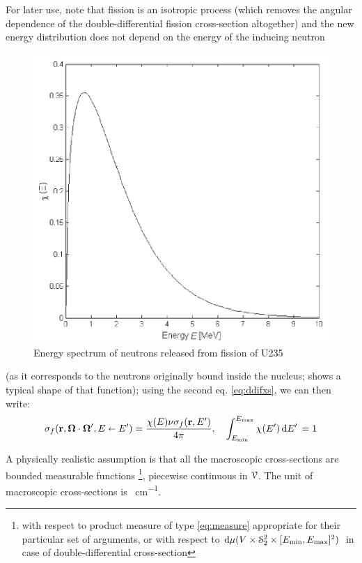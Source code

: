 For later use, note that fission is an isotropic process (which removes the angular dependence of the
double-differential fission cross-section altogether) and the new energy distribution does not depend on the energy of 
the inducing neutron 
\begin{figure}[hbt]
\begin{center}
  \includegraphics[scale=.6]{spectrum}
  \caption{Energy spectrum of neutrons released from fission of U235}
  \label{fig:spectrum}
\end{center}
\end{figure}
(as it corresponds to the neutrons originally bound inside the nucleus; 
shows a typical shape of that function); using the second eq.
\eqref{eq:ddifxs}, we can then write:
\begin{equation}\label{eq:sf}
\sigma_f(\br,\bomega\cdot\bomega',E\sla E') = \frac{\chi(E)\nu\sigma_f(\br,E')}{4\pi},\quad 
\intE[']{\Emin}{\Emax}{\chi(E')} = 1
\end{equation}

A physically realistic assumption is that all the macroscopic cross-sections are bounded measurable functions
 \footnote{with respect to product measure of type \eqref{eq:measure} appropriate for their particular set of arguments,
 or with respect to $\d{\mu(V\times\Sphere^2\times [\Emin,\Emax]^2)}$ in case of double-differential cross-section},
 piecewise continuous in $\VV$. The unit of macroscopic cross-sections is \SI{}{cm^{-1}}.

